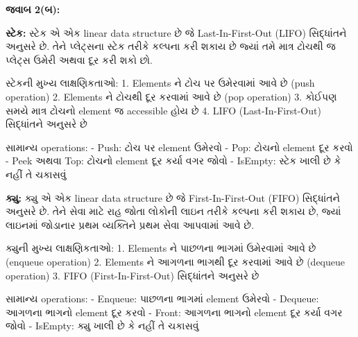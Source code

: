 \textbf{જવાબ 2(બ):}

\textbf{સ્ટેક:} સ્ટેક એ એક linear data structure છે જે Last-In-First-Out
(LIFO) સિદ્ધાંતને અનુસરે છે. તેને પ્લેટ્સના સ્ટેક તરીકે કલ્પના કરી શકાય છે જ્યાં તમે માત્ર
ટોચથી જ પ્લેટ્સ ઉમેરી અથવા દૂર કરી શકો છો.

સ્ટેકની મુખ્ય લાક્ષણિકતાઓ: 1. Elements ને ટોચ પર ઉમેરવામાં આવે છે (push operation)
2. Elements ને ટોચથી દૂર કરવામાં આવે છે (pop operation) 3. કોઈપણ સમયે માત્ર
ટોચનો element જ accessible હોય છે 4. LIFO (Last-In-First-Out) સિદ્ધાંતને
અનુસરે છે

સામાન્ય operations: - Push: ટોચ પર element ઉમેરવો - Pop: ટોચનો element દૂર
કરવો - Peek અથવા Top: ટોચનો element દૂર કર્યા વગર જોવો - IsEmpty: સ્ટેક ખાલી
છે કે નહીં તે ચકાસવું

\begin{Shaded}
\begin{Highlighting}[]
\end{Highlighting}
\end{Shaded}

\textbf{ક્યુ:} ક્યુ એ એક linear data structure છે જે First-In-First-Out (FIFO)
સિદ્ધાંતને અનુસરે છે. તેને સેવા માટે રાહ જોતા લોકોની લાઇન તરીકે કલ્પના કરી શકાય છે,
જ્યાં લાઇનમાં જોડાનાર પ્રથમ વ્યક્તિને પ્રથમ સેવા આપવામાં આવે છે.

ક્યુની મુખ્ય લાક્ષણિકતાઓ: 1. Elements ને પાછળના ભાગમાં ઉમેરવામાં આવે છે (enqueue
operation) 2. Elements ને આગળના ભાગથી દૂર કરવામાં આવે છે (dequeue operation)
3. FIFO (First-In-First-Out) સિદ્ધાંતને અનુસરે છે

સામાન્ય operations: - Enqueue: પાછળના ભાગમાં element ઉમેરવો - Dequeue:
આગળના ભાગનો element દૂર કરવો - Front: આગળના ભાગનો element દૂર કર્યા વગર
જોવો - IsEmpty: ક્યુ ખાલી છે કે નહીં તે ચકાસવું

\begin{Shaded}
\begin{Highlighting}[]
\end{Highlighting}
\end{Shaded}

